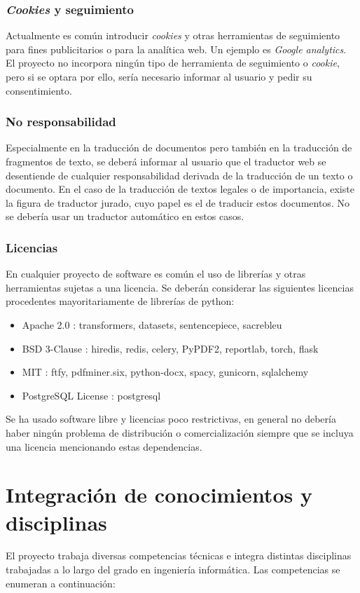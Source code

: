 \subsubsection{\textit{Cookies} y seguimiento}
Actualmente es común introducir \textit{cookies} y otras herramientas de seguimiento para fines publicitarios o para la analítica web. Un ejemplo es \textit{Google analytics}. El proyecto no incorpora ningún tipo de herramienta de seguimiento o \textit{cookie}, pero si se optara por ello, sería necesario informar al usuario y pedir su consentimiento.

\subsubsection{No responsabilidad}
Especialmente en la traducción de documentos pero también en la traducción de fragmentos de texto, se deberá informar al usuario que el traductor web se desentiende de cualquier responsabilidad derivada de la traducción de un texto o documento. En el caso de la traducción de textos legales o de importancia, existe la figura de traductor jurado, cuyo papel es el de traducir estos documentos. No se debería usar un traductor automático en estos casos.

\subsubsection{Licencias}
En cualquier proyecto de software es común el uso de librerías y otras herramientas sujetas a una licencia. Se deberán considerar las siguientes licencias procedentes mayoritariamente de librerías de python:
\begin{itemize}
    \item Apache 2.0 \cite{Apache2license}: transformers, datasets, sentencepiece, sacrebleu
    \item BSD 3-Clause \cite{BSD3Clause}: hiredis, redis, celery, PyPDF2, reportlab, torch, flask
    \item MIT \cite{MITLicense}: ftfy, pdfminer.six, python-docx, spacy, gunicorn, sqlalchemy
    \item PostgreSQL License \cite{Postgreslicense}: postgresql
\end{itemize}
Se ha usado software libre y licencias poco restrictivas, en general no debería haber ningún problema de distribución o comercialización siempre que se incluya una licencia mencionando estas dependencias.

\section{Integración de conocimientos y disciplinas}\label{assigconoci}
El proyecto trabaja diversas competencias técnicas e integra distintas disciplinas trabajadas a lo largo del grado en ingeniería informática. Las competencias se enumeran a continuación:

